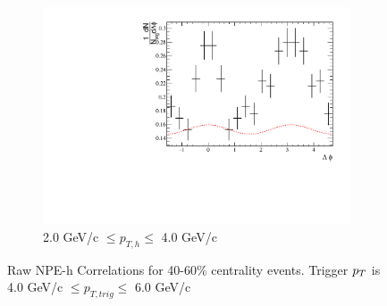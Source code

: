 \begin{figure}[htbp]
\begin{center}
\begin{subfigure}{0.5\textwidth}
		\includegraphics[width=\textwidth]{Plots/Correlations/raw/NPE_eh_corr_raw_primpt_4_5_cent_2_3_assopt_3_4.pdf}
		\caption{2.0 GeV/c $\leq p_{T,h} \leq$ 4.0 GeV/c}
		\label{fig:Raw4060c}
	\end{subfigure}	
\end{center}
\caption[Raw Correlations 40-60\% Centrality]{Raw NPE-h Correlations for 40-60\% centrality events. Trigger $p_{T}$ is 4.0 GeV/c $\leq p_{T,trig} \leq$ 6.0 GeV/c}
\label{fig:Raw4060}
\end{figure}

